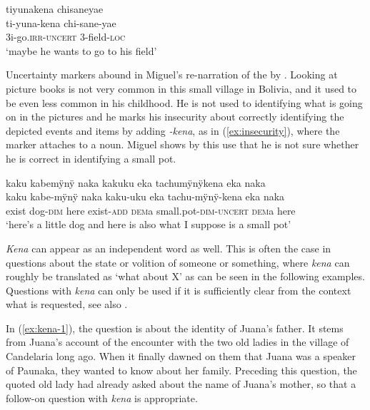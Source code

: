 \ea\label{ex:SPEC-2}
\begingl 
\glpreamble tiyunakena chisaneyae\\
\gla ti-yuna-kena chi-sane-yae\\ 
\glb 3i-go.\textsc{irr}-\textsc{uncert} 3-field-\textsc{loc}\\ 
\glft ‘maybe he wants to go to his field’
\trailingcitation{[rxx-e120511l.348]}
\xe

Uncertainty markers abound in Miguel’s re-narration of the  by \citet[]{Mayer2003}. Looking at picture books is not very common in this small village in Bolivia, and it used to be even less common in his childhood. He is not used to identifying what is going on in the pictures and he marks his insecurity about correctly identifying the depicted events and items by adding \textit{-kena}, as in (\ref{ex:insecurity}), where the marker attaches to a noun. Miguel shows by this use that he is not sure whether he is correct in identifying a small pot.

\ea\label{ex:insecurity}
\begingl 
\glpreamble kaku kabemÿnÿ naka kakuku eka tachumÿnÿkena eka naka\\
\gla kaku kabe-mÿnÿ naka kaku-uku eka tachu-mÿnÿ-kena eka naka\\ 
\glb exist dog-\textsc{dim} here exist-\textsc{add} \textsc{dem}a small.pot-\textsc{dim}-\textsc{uncert} \textsc{dem}a here\\ 
\glft ‘here’s a little dog and here is also what I suppose is a small pot’
\trailingcitation{[mox-a110920l-2.007]}
\xe

\textit{Kena} can appear as an independent word as well. This is often the case in questions about the state or volition of someone or something, where \textit{kena} can roughly be translated as ‘what about X’ as can be seen in the following examples. Questions with \textit{kena} can only be used if it is sufficiently clear from the context what is requested, see also .

In (\ref{ex:kena-1}), the question is about the identity of Juana’s father. It stems from Juana’s account of the encounter with the two old ladies in the village of Candelaria long ago. When it finally dawned on them that Juana was a speaker of Paunaka, they wanted to know about her family. Preceding this question, the quoted old lady had already asked about the name of Juana’s mother, so that a follow-on question with \textit{kena} is appropriate. %

